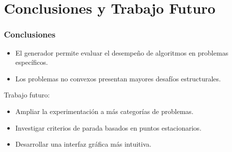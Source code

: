 \documentclass[10pt]{beamer}
\begin{document}
\section{Conclusiones y Trabajo Futuro}
\begin{frame}
\frametitle{Conclusiones}
\begin{itemize}
    \item El generador permite evaluar el desempeño de algoritmos en problemas específicos.
    \item Los problemas no convexos presentan mayores desafíos estructurales.
\end{itemize}
Trabajo futuro:
\begin{itemize}
    \item Ampliar la experimentación a más categorías de problemas.
    \item Investigar criterios de parada basados en puntos estacionarios.
    \item Desarrollar una interfaz gráfica más intuitiva.
\end{itemize}
\end{frame}
\end{document}

